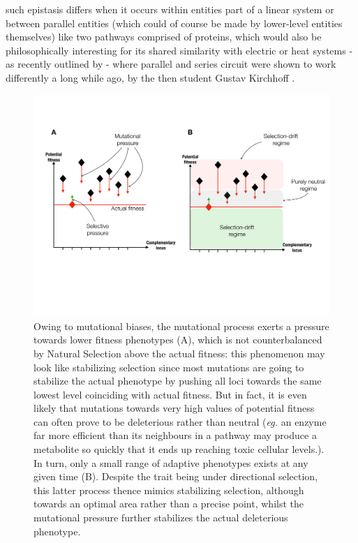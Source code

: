such epistasis differs when it occurs within entities part of a linear system or between parallel entities (which could of course be made by lower-level entities themselves) like two pathways comprised of proteins, which would also be philosophically interesting for its shared similarity with electric or heat systems - as recently outlined by \citet{Yi19} - where parallel and series circuit were shown to work differently a long while ago, by the then student Gustav Kirchhoff \citep{Charbonneau14}.\\

\begin{figure}[h!]
    \centering
    \includegraphics[scale=0.45,trim=1cm 7cm 0cm 4cm,clip]{pics/Epistasis/Stabilizing-mimetism.pdf}
    \caption{Owing to mutational biases, the mutational process exerts a pressure towards lower fitness phenotypes (A), which is not counterbalanced by Natural Selection above the actual fitness: this phenomenon may look like stabilizing selection since most mutations are going to stabilize the actual phenotype by pushing all loci towards the same lowest level coinciding with actual fitness. But in fact, it is even likely that mutations towards very high values of potential fitness can often prove to be deleterious rather than neutral (\textit{eg.} an enzyme far more efficient than its neighbours in a pathway may produce a metabolite so quickly that it ends up reaching toxic cellular levels.). In turn, only a small range of adaptive phenotypes exists at any given time (B). Despite the trait being under directional selection, this latter process thence mimics stabilizing selection, although towards an optimal area rather than a precise point, whilst the mutational pressure further stabilizes the actual deleterious phenotype.}
    \label{fig:stab-mim}
\end{figure}

